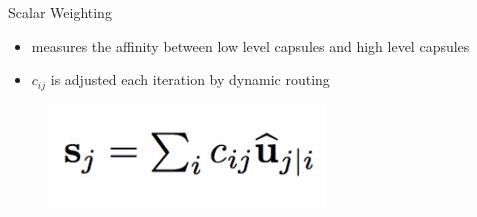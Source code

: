 \documentclass{beamer}
\begin{document}
\begin{frame}{Scalar Weighting}
    \begin{itemize}
        \item measures the affinity between low level capsules and high level capsules
        \item $c_{ij}$ is adjusted each iteration by dynamic routing
    \end{itemize}
    \begin{figure}
        \centering
        \includegraphics{capsule_2.JPG}
    \end{figure}
\end{frame}
\end{document}
